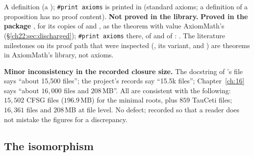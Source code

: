\begin{status}
A definition (a ); \texttt{\#print axioms}  is printed in
 (standard axioms; a definition of a proposition has no proof content).
\textbf{Not proved in the library.}  \textbf{Proved in the package }, for its copies of
 and , as the theorem  with value AxiomMath's 
(\S\ref{ch22:sec:discharged}); \texttt{\#print axioms} there, of  and of :
.  The
literature milestones on its proof path that were
inspected (, its  variant, and
) are theorems in AxiomMath's library, not axioms.
\end{status}

\begin{warning}
\textbf{Minor inconsistency in the recorded closure size.}  The docstring of 's file says ``about 15,500
files''; the project's records say ``15.5k files''; Chapter~\ref{ch:16} says ``about $16{,}000$ files and $208$\,MB''.  All are
consistent with the following: $15{,}502$ CFSG files ($196.9$\,MB) for the minimal roots, plus $859$ TauCeti
files; $16{,}361$ files and $208$\,MB at file level.  No defect; recorded so that a reader does not mistake the figures for a
discrepancy.
\end{warning}

\subsection{The isomorphism}

